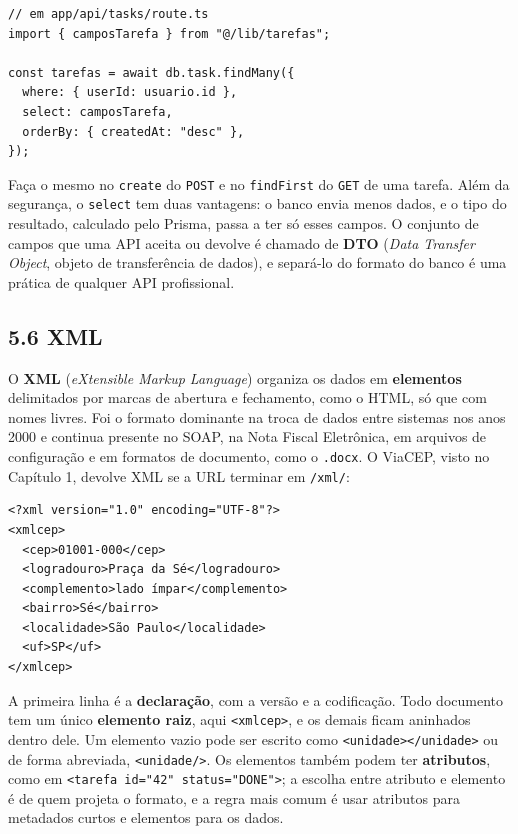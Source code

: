 \begin{codigo}
\begin{Verbatim}[breaklines=true, breaksymbolleft={}, fontsize=\footnotesize]
// em app/api/tasks/route.ts
import { camposTarefa } from "@/lib/tarefas";

const tarefas = await db.task.findMany({
  where: { userId: usuario.id },
  select: camposTarefa,
  orderBy: { createdAt: "desc" },
});
\end{Verbatim}
\end{codigo}

Faça o mesmo no \texttt{create} do \texttt{POST} e no \texttt{findFirst} do \texttt{GET} de uma tarefa. Além da segurança, o \texttt{select} tem duas vantagens: o banco envia menos dados, e o tipo do resultado, calculado pelo Prisma, passa a ter só esses campos. O conjunto de campos que uma API aceita ou devolve é chamado de \textbf{DTO} (\textit{Data Transfer Object}, objeto de transferência de dados), e separá-lo do formato do banco é uma prática de qualquer API profissional.

\subsection{5.6 XML}

O \textbf{XML} (\textit{eXtensible Markup Language}) organiza os dados em \textbf{elementos} delimitados por marcas de abertura e fechamento, como o HTML, só que com nomes livres. Foi o formato dominante na troca de dados entre sistemas nos anos 2000 e continua presente no SOAP, na Nota Fiscal Eletrônica, em arquivos de configuração e em formatos de documento, como o \texttt{.docx}. O ViaCEP, visto no Capítulo 1, devolve XML se a URL terminar em \texttt{/xml/}:

\begin{codigo}
\begin{Verbatim}[breaklines=true, breaksymbolleft={}, fontsize=\footnotesize]
<?xml version="1.0" encoding="UTF-8"?>
<xmlcep>
  <cep>01001-000</cep>
  <logradouro>Praça da Sé</logradouro>
  <complemento>lado ímpar</complemento>
  <bairro>Sé</bairro>
  <localidade>São Paulo</localidade>
  <uf>SP</uf>
</xmlcep>
\end{Verbatim}
\end{codigo}

A primeira linha é a \textbf{declaração}, com a versão e a codificação. Todo documento tem um único \textbf{elemento raiz}, aqui \texttt{<xmlcep>}, e os demais ficam aninhados dentro dele. Um elemento vazio pode ser escrito como \texttt{<unidade></unidade>} ou de forma abreviada, \texttt{<unidade/>}. Os elementos também podem ter \textbf{atributos}, como em \texttt{<tarefa id="42" status="DONE">}; a escolha entre atributo e elemento é de quem projeta o formato, e a regra mais comum é usar atributos para metadados curtos e elementos para os dados.

